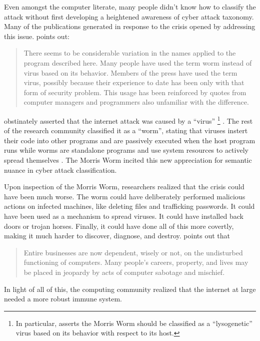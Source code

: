Even amongst the computer literate, many people didn't know how to classify
the attack without first developing a heightened awareness of cyber attack
taxonomy. Many of the publications generated in response to the crisis opened 
by addressing this issue. \cite{spafford_internet_1989-1} points out:
\begin{quote}
There seems to be considerable variation in the names applied to the program
described here. Many people have used the term worm instead of virus based on its
behavior. Members of the press have used the term virus, possibly because their 
experience  to date has been only with that form of security problem. This usage
has been reinforced by quotes from computer managers and programmers also
unfamiliar with the difference.
\end{quote}
\cite{eichin_microscope_1989} obstinately asserted that the internet
attack was caused by a ``virus''
\footnote{In particular,
\cite{eichin_microscope_1989} asserts the Morris Worm should be classified as a
``lysogenetic'' virus based on its behavior with respect to its host.}
. The rest of the research community classified it as a ``worm'', stating that
viruses instert their code into other programs and are passively executed when
the host program runs while worms are standalone programs and use system
resources to actively spread themselves \cite{seeley_tour_1989,
spafford_internet_1989, spafford_internet_1989-1}. The Morris Worm 
incited this new appreciation for semantic nuance in cyber attack
classification. 

Upon inspection of the Morris Worm, researchers realized that the crisis could 
have been much worse. The worm could have deliberately performed malicious
actions on infected machines, like deleting files and trafficking passwords. It
could have been used as a mechanism to spread viruses. It could have installed
back doors or trojan horses. Finally, it could have done all of this more
covertly, making it much harder to discover, diagnose, and destroy.
\cite{spafford_crisis_1989} points out that
\begin{quote}
Entire businesses are now dependent, wisely or not, on the undisturbed
functioning of computers. Many people's careers, property, and lives may be
placed in jeopardy by acts of computer sabotage and mischief.
\end{quote} 

In light of all of this, the computing community realized that the internet at
large needed a more robust immune system.
           	
